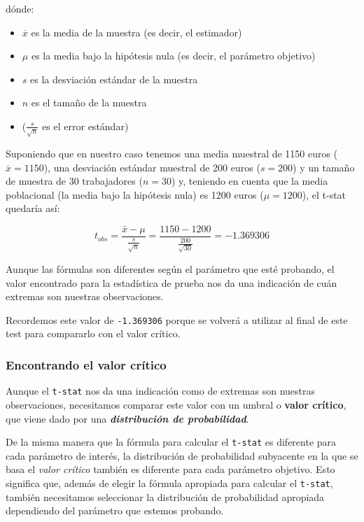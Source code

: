 \documentclass[
]{book}
\providecommand{\tightlist}{%
  \setlength{\itemsep}{0pt}\setlength{\parskip}{0pt}}
\begin{document}
dónde:

\begin{itemize}
\tightlist
\item
  \(\overline{x}\) es la media de la muestra (es decir, el estimador)
\item
  \(\mu\) es la media bajo la hipótesis nula (es decir, el parámetro objetivo)
\item
  \(s\) es la desviación estándar de la muestra
\item
  \(n\) es el tamaño de la muestra
\item
  (\(\frac{s}{\sqrt{n}}\) es el error estándar)
\end{itemize}

Suponiendo que en nuestro caso tenemos una media muestral de 1150 euros (\(\overline{x} = 1150\)), una desviación estándar muestral de 200 euros (\(s=200\)) y un tamaño de muestra de 30 trabajadores (\(n=30\)) y, teniendo en cuenta que la media poblacional (la media bajo la hipótesis nula) es 1200 euros (\(\mu=1200\)), el t-stat quedaría así:

\[t_{obs} = \frac{\bar{x} - \mu}{\frac{s}{\sqrt{n}}} = \frac{1150 - 1200}{\frac{200}{\sqrt{30}}} = -1.369306\]

Aunque las fórmulas son diferentes según el parámetro que esté probando, el valor encontrado para la estadística de prueba nos da una indicación de cuán extremas son nuestras observaciones.

Recordemos este valor de \texttt{-1.369306} porque se volverá a utilizar al final de este test para compararlo con el valor crítico.

\hypertarget{encontrando-el-valor-cruxedtico}{%
\subsubsection{Encontrando el valor crítico}\label{encontrando-el-valor-cruxedtico}}

Aunque el \texttt{t-stat} nos da una indicación como de extremas son nuestras observaciones, necesitamos comparar este valor con un umbral o \textbf{valor crítico}, que viene dado por una \textbf{\emph{distribución de probabilidad}}.

De la misma manera que la fórmula para calcular el \texttt{t-stat} es diferente para cada parámetro de interés, la distribución de probabilidad subyacente en la que se basa el \emph{valor crítico} también es diferente para cada parámetro objetivo. Esto significa que, además de elegir la fórmula apropiada para calcular el \texttt{t-stat}, también necesitamos seleccionar la distribución de probabilidad apropiada dependiendo del parámetro que estemos probando.
\end{document}
